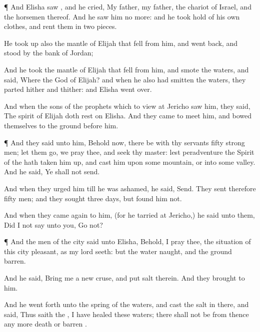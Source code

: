 {\par }{\PP {}¶ And
Elisha
saw
{}, and he
cried, My
father, my
father, the
chariot of
Israel, and the
horsemen thereof. And he
saw him no more: and he took
hold of his own
clothes, and
rent them in
two
pieces.


\par }{\PP {}He took
up also the
mantle of
Elijah that
fell from him, and went
back, and
stood by the
bank of
Jordan;

And he
took the
mantle of
Elijah that
fell from him, and
smote the
waters, and
said, Where
{} the
{}
God of
Elijah? and when he also had
smitten the
waters, they
parted hither and thither: and
Elisha went
over.

And when the
sons of the
prophets which
{} to view at
Jericho
saw him, they
said, The
spirit of
Elijah doth
rest on
Elisha. And they
came to
meet him, and
bowed themselves to the
ground before him.


\par }{\PP {}¶ And they
said unto him, Behold now, there
be with thy
servants
fifty
strong
men; let them
go, we pray thee, and
seek thy
master: lest peradventure the
Spirit of the
{} hath taken him
up, and
cast him upon
some
mountain, or into
some
valley. And he
said, Ye shall not
send.

And when they
urged him till he was
ashamed, he
said,
Send. They
sent therefore
fifty
men; and they
sought
three
days, but
found him not.

And when they came
again to him, (for he
tarried at
Jericho,) he
said unto them, Did I not
say unto you,
Go not?


\par }{\PP {}¶ And the
men of the
city
said unto
Elisha, Behold, I pray thee, the
situation of this
city
{}
pleasant, as my
lord
seeth: but the
water
{}
naught, and the
ground
barren.

And he
said,
Bring me a
new
cruse, and
put
salt therein. And they
brought
{} to him.

And he went
forth unto the
spring of the
waters, and
cast the
salt in there, and
said, Thus
saith the
{}, I have
healed these
waters; there shall not be from thence any more
death or
barren
{}.

}
